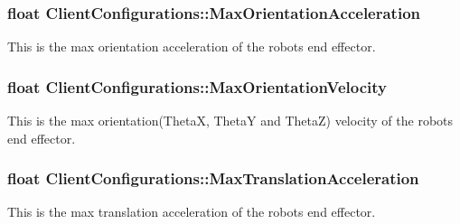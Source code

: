 \subsubsection[{\texorpdfstring{Max\+Orientation\+Acceleration}{MaxOrientationAcceleration}}]{\setlength{\rightskip}{0pt plus 5cm}float Client\+Configurations\+::\+Max\+Orientation\+Acceleration}\hypertarget{struct_client_configurations_a6dd1f0fa61310ae5c7c090b4f203b8a0}{}\label{struct_client_configurations_a6dd1f0fa61310ae5c7c090b4f203b8a0}


This is the max orientation acceleration of the robot\textquotesingle{}s end effector. 

\subsubsection[{\texorpdfstring{Max\+Orientation\+Velocity}{MaxOrientationVelocity}}]{\setlength{\rightskip}{0pt plus 5cm}float Client\+Configurations\+::\+Max\+Orientation\+Velocity}\hypertarget{struct_client_configurations_a238936e76488a26a5f816413cd25977e}{}\label{struct_client_configurations_a238936e76488a26a5f816413cd25977e}


This is the max orientation(\+Theta\+X, Theta\+Y and Theta\+Z) velocity of the robot\textquotesingle{}s end effector. 

\subsubsection[{\texorpdfstring{Max\+Translation\+Acceleration}{MaxTranslationAcceleration}}]{\setlength{\rightskip}{0pt plus 5cm}float Client\+Configurations\+::\+Max\+Translation\+Acceleration}\hypertarget{struct_client_configurations_a787ef22ca55cd38c04f171b885eccffc}{}\label{struct_client_configurations_a787ef22ca55cd38c04f171b885eccffc}


This is the max translation acceleration of the robot\textquotesingle{}s end effector. 

